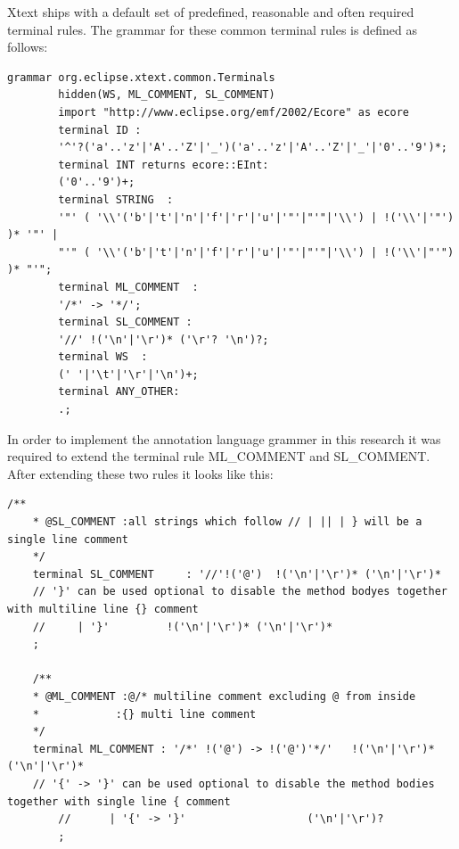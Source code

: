 Xtext ships with a default set of predefined, reasonable and often required terminal rules. The grammar for these common terminal rules is defined as follows:
	\begin{lstlisting}[caption={Common terminal Rules in Xtext },label=lst:xtextCommonTerminalRules]
		grammar org.eclipse.xtext.common.Terminals 
		hidden(WS, ML_COMMENT, SL_COMMENT)
		import "http://www.eclipse.org/emf/2002/Ecore" as ecore
		terminal ID : 
		'^'?('a'..'z'|'A'..'Z'|'_')('a'..'z'|'A'..'Z'|'_'|'0'..'9')*;
		terminal INT returns ecore::EInt: 
		('0'..'9')+;
		terminal STRING  : 
		'"' ( '\\'('b'|'t'|'n'|'f'|'r'|'u'|'"'|"'"|'\\') | !('\\'|'"') )* '"' |
		"'" ( '\\'('b'|'t'|'n'|'f'|'r'|'u'|'"'|"'"|'\\') | !('\\'|"'") )* "'"; 
		terminal ML_COMMENT  : 
		'/*' -> '*/';
		terminal SL_COMMENT : 
		'//' !('\n'|'\r')* ('\r'? '\n')?;
		terminal WS  : 
		(' '|'\t'|'\r'|'\n')+;
		terminal ANY_OTHER: 
		.;
	\end{lstlisting}

In order to implement the annotation language grammer in this research it was required to extend the terminal rule ML\_COMMENT and SL\_COMMENT. After extending these two rules it looks like this:

\begin{lstlisting}[caption={Sigleline and Multiline Comments Rule in Xtext},label=lst:slMlRuleXtext]
	/**
	* @SL_COMMENT :all strings which follow // | || | } will be a single line comment
	*/ 
	terminal SL_COMMENT 	: '//'!('@')  !('\n'|'\r')* ('\n'|'\r')*
	// '}' can be used optional to disable the method bodyes together with multiline line {} comment 
	//     | '}'         !('\n'|'\r')* ('\n'|'\r')*               
	;
	
	/**
	* @ML_COMMENT :@/* multiline comment excluding @ from inside
	*            :{} multi line comment 
	*/ 
	terminal ML_COMMENT	: '/*' !('@') -> !('@')'*/'   !('\n'|'\r')* ('\n'|'\r')*   
	// '{' -> '}' can be used optional to disable the method bodies together with single line { comment 
		//      | '{' -> '}'                   ('\n'|'\r')?
		;   
\end{lstlisting}


